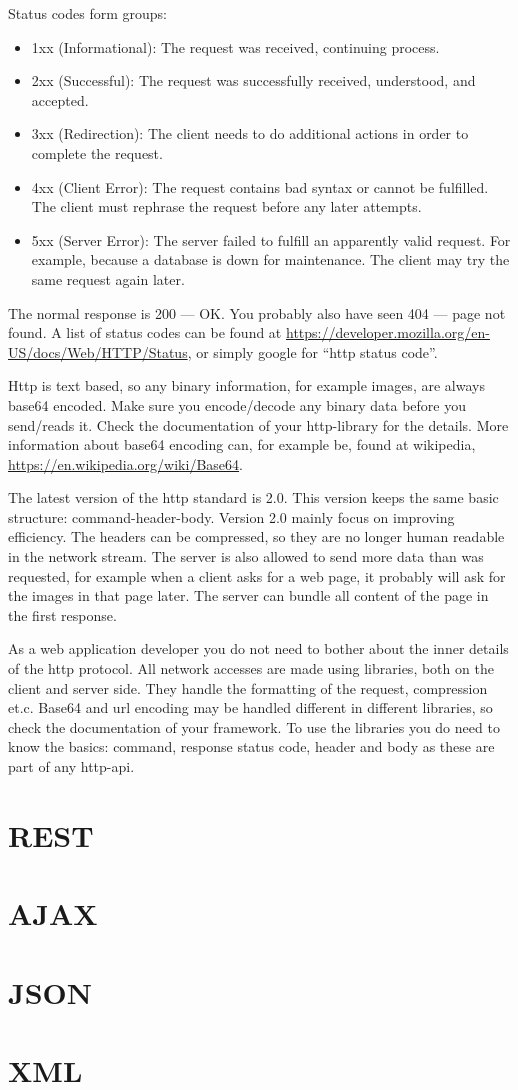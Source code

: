 Status codes form groups:
\begin{itemize}
\item1xx (Informational): The request was received, continuing process.
\item2xx (Successful): The request was successfully received, understood, and accepted.
\item3xx (Redirection): The client needs to do additional actions in order to complete the request.
\item4xx (Client Error): The request contains bad syntax or cannot be fulfilled. The client must rephrase the request before any later attempts.
\item5xx (Server Error): The server failed to fulfill an apparently valid request. For example, because a database is down for maintenance. The client may try the same request again later.
\end{itemize}
The normal response is 200 --- OK. You probably also have seen 404 --- page not found. A list of status codes can be found at \url{https://developer.mozilla.org/en-US/docs/Web/HTTP/Status}, or simply google for ``http status code''. 

Http is text based, so any binary information, for example images, are always base64 encoded. Make sure you encode/decode any binary data before you send/reads it. Check the documentation of your http-library for the details. More information about base64 encoding can, for example be, found at wikipedia, \url{https://en.wikipedia.org/wiki/Base64}.

The latest version of the http standard is 2.0. This version keeps the same basic structure: command-header-body. Version 2.0 mainly focus on improving efficiency. The headers can be compressed, so they are no longer human readable in the network stream. The server is also allowed to send more data than was requested, for example when a client asks for a web page, it probably will ask for the images in that page later. The server can bundle all content of the page in the first response.

As a web application developer you do not need to bother about the inner details of the http protocol. All network accesses are made using libraries, both on the client and server side. They handle the formatting of the request, compression et.c. Base64 and url encoding may be handled different in different libraries, so check the documentation of your framework. To use the libraries you do need to know the basics: command, response status code, header and body as these are part of any http-api.

\section{REST} \label{section:rest}

\section{AJAX} \label{section:ajax}

\section{JSON} \label{section:json}


\section{XML} \label{section:xml}



